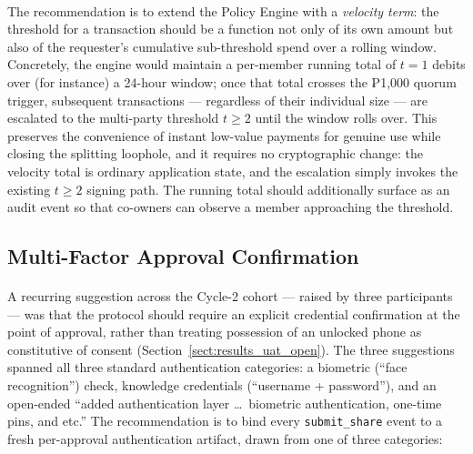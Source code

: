 \paragraph{}The recommendation is to extend the Policy Engine with a \textit{velocity term}: the threshold for a transaction should be a function not only of its own amount but also of the requester's cumulative sub-threshold spend over a rolling window. Concretely, the engine would maintain a per-member running total of $t = 1$ debits over (for instance) a 24-hour window; once that total crosses the ₱1{,}000 quorum trigger, subsequent transactions --- regardless of their individual size --- are escalated to the multi-party threshold $t \geq 2$ until the window rolls over. This preserves the convenience of instant low-value payments for genuine use while closing the splitting loophole, and it requires no cryptographic change: the velocity total is ordinary application state, and the escalation simply invokes the existing $t \geq 2$ signing path. The running total should additionally surface as an audit event so that co-owners can observe a member approaching the threshold.

\subsection{Multi-Factor Approval Confirmation}
\label{sect:rec_mfa}

\paragraph{}A recurring suggestion across the Cycle-2 cohort --- raised by three participants --- was that the protocol should require an explicit credential confirmation at the point of approval, rather than treating possession of an unlocked phone as constitutive of consent (Section~\ref{sect:results_uat_open}). The three suggestions spanned all three standard authentication categories: a biometric (``face recognition'') check, knowledge credentials (``username + password''), and an open-ended ``added authentication layer \dots\ biometric authentication, one-time pins, and etc.'' The recommendation is to bind every \texttt{submit\_share} event to a fresh per-approval authentication artifact, drawn from one of three categories:

